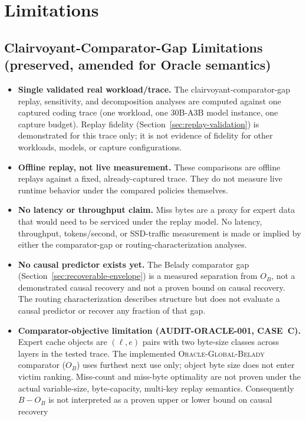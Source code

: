 \section{Limitations}
\label{sec:limitations}

\subsection*{Clairvoyant-Comparator-Gap Limitations (preserved, amended for Oracle semantics)}
\begin{itemize}
 \item \textbf{Single validated real workload/trace.} The
   clairvoyant-comparator-gap replay, sensitivity, and decomposition analyses are
   computed against one captured coding trace (one workload, one
   30B-A3B model instance, one capture budget). Replay fidelity
   (Section~\ref{sec:replay-validation}) is demonstrated for this trace
   only; it is not evidence of fidelity for other workloads, models, or
   capture configurations.
 \item \textbf{Offline replay, not live measurement.} These comparisons are
   offline replays against a fixed, already-captured trace. They do not
   measure live runtime behavior under the compared policies themselves.
 \item \textbf{No latency or throughput claim.} Miss bytes are a proxy for
   expert data that would need to be serviced under the replay model. No
   latency, throughput, tokens/second, or SSD-traffic measurement is made
   or implied by either the comparator-gap or routing-characterization analyses.
 \item \textbf{No causal predictor exists yet.} The Belady comparator gap
   (Section~\ref{sec:recoverable-envelope}) is a measured separation from
   $O_B$, not a demonstrated causal recovery and not a proven bound on
   causal recovery. The routing characterization describes structure but does not
   evaluate a causal predictor or recover any fraction of that gap.
 \item \textbf{Comparator-objective limitation (\textsc{AUDIT-ORACLE-001},
   CASE~C).} Expert cache objects are $(\ell,e)$ pairs with two byte-size
   classes across layers in the tested trace. The implemented
   \textsc{Oracle-Global-Belady} comparator ($O_B$) uses furthest next use
   only; object byte size does not enter victim ranking. Miss-count and
   miss-byte optimality are not proven under the actual variable-size,
   byte-capacity, multi-key replay semantics. Consequently $B-O_B$ is not
   interpreted as a proven upper or lower bound on causal recovery

\end{itemize}
